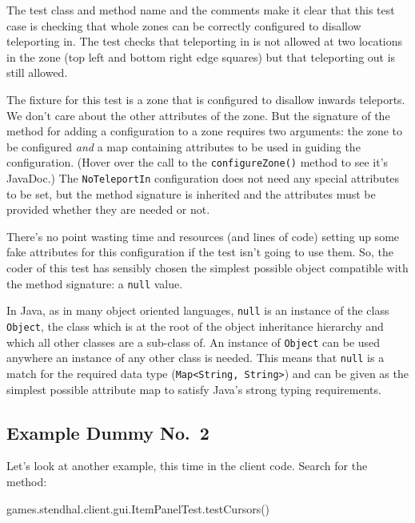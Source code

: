 \documentclass[
]{book}
\newenvironment{Shaded}{\begin{snugshade}}{\end{snugshade}}
\newcommand{\FunctionTok}[1]{\textcolor[rgb]{0.00,0.00,0.00}{#1}}
\newcommand{\NormalTok}[1]{#1}
\begin{document}
The test class and method name and the comments make it clear that this test case is checking that whole zones can be correctly configured to disallow teleporting in. The test checks that teleporting in is not allowed at two locations in the zone (top left and bottom right edge squares) but that teleporting out is still allowed.

The fixture for this test is a zone that is configured to disallow inwards teleports. We don't care about the other attributes of the zone. But the signature of the method for adding a configuration to a zone requires two arguments: the zone to be configured \emph{and} a map containing attributes to be used in guiding the configuration. (Hover over the call to the \texttt{configureZone()} method to see it's JavaDoc.) The \texttt{NoTeleportIn} configuration does not need any special attributes to be set, but the method signature is inherited and the attributes must be provided whether they are needed or not.

There's no point wasting time and resources (and lines of code) setting up some fake attributes for this configuration if the test isn't going to use them. So, the coder of this test has sensibly chosen the simplest possible object compatible with the method signature: a \texttt{null} value.

In Java, as in many object oriented languages, \texttt{null} is an instance of the class \texttt{Object}, the class which is at the root of the object inheritance hierarchy and which all other classes are a sub-class of. An instance of \texttt{Object} can be used anywhere an instance of any other class is needed. This means that \texttt{null} is a match for the required data type (\texttt{Map\textless{}String,\ String\textgreater{}}) and can be given as the simplest possible attribute map to satisfy Java's strong typing requirements.

\hypertarget{dummy2}{%
\subsection{Example Dummy No.~2}\label{dummy2}}

Let's look at another example, this time in the client code. Search for the method:

\begin{Shaded}
\begin{Highlighting}[]
\NormalTok{games.}\FunctionTok{stendhal}\NormalTok{.}\FunctionTok{client}\NormalTok{.}\FunctionTok{gui}\NormalTok{.}\FunctionTok{ItemPanelTest}\NormalTok{.}\FunctionTok{testCursors}\NormalTok{()}
\end{Highlighting}
\end{Shaded}
\end{document}
